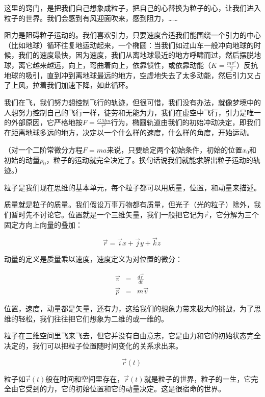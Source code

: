 这里的窍门，是把我们自己想象成粒子，把自己的心替换为粒子的心，让我们进入粒子的世界。我们会感到有风迎面吹来，感到阻力，……

阻力是阻碍粒子运动的。我们喜欢引力，只要速度合适我们能围绕一个引力的中心（比如地球）循环往复地运动起来，一个椭圆：当我们如过山车一般冲向地球的时候，我们的速度最快，因为速度，我们从离地球最近的地方呼啸而过，然后摆脱地球，离它越来越远，向上，弯曲着向上，依靠惯性，或依靠动能（$K = \frac{mv^2}{2}$）反抗地球的吸引，直到冲到离地球最远的地方，空虚地失去了太多动能，然后引力又占了上风，拉着我们加速下降，如此循环。

我们在飞，我们努力想控制飞行的轨迹，但很可惜，我们没有办法，就像梦境中的人想努力控制自己的飞行一样，徒劳和无能为力，我们在虚空中飞行，引力是唯一的外部原因，它严格地按$F = \frac{G M m}{r^2}$行为，椭圆轨道由我们的初始冲动决定，即我们在距离地球多远的地方，决定以一个什么样的速度，什么样的角度，开始运动。

（对一个二阶常微分方程$F = m a$来说，只要给定两个初始条件，初始的位置$x_0$和初始的动量$p_0$，粒子的运动就完全决定了。换句话说我们就能求解出粒子运动的轨迹。）

粒子是我们现在思维的基本单元，每个粒子都可以用质量，位置，和动量来描述。

质量就是粒子的质量。我们假设万事万物都有质量，但光子（光的粒子）除外，我们暂时先不讨论它。位置就是一个三维矢量，我们一般把它记为$\vec r$，它分解为三个固定方向上向量的叠加：

\begin{equation}
\vec r = \vec i x + \vec j y + \vec k z~
\end{equation}

动量的定义是质量乘以速度，速度定义为对位置的微分：

\begin{align}
\vec v & = & \frac{d \vec r}{d t} \\
\vec p  & = & m \vec v~
\end{align}

位置，速度，动量都是矢量，还有力，这给我们的想象力带来极大的挑战，为了思维的轻松，我们往往把它们想象为二维的或一维的。

粒子在三维空间里飞来飞去，但它并没有自由意志，它是由力和它的初始状态完全决定的，我们可以把粒子位置随时间变化的关系求出来。

\begin{equation}
 \vec r(t)~
\end{equation}

粒子如$\vec r(t)$般在时间和空间里存在，$\vec r(t)$就是粒子的世界，粒子的一生，它完全由它受到的力，它的初始位置和它的动量决定。这是很宿命的世界。

